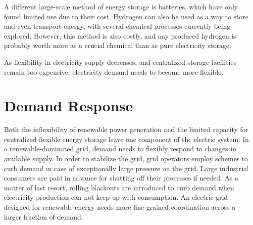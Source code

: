 A different large-scale method of energy storage is batteries, which have only found limited use due to their cost. Hydrogen can also be used as a way to store and even transport energy, with several chemical processes currently being explored.
However, this method is also costly, and any produced hydrogen is probably worth more as a crucial chemical than as pure electricity storage.

As flexibility in electricity supply decreases, and centralized storage facilities remain too expensive, electricity demand needs to become more flexible.


\section{Demand Response}

Both the inflexibility of renewable power generation and the limited capacity for centralized flexible energy storage leave one component of the electric system: In a renewable-dominated grid, demand needs to flexibly respond to changes in available supply.
In order to stabilize the grid, grid operators employ schemes to curb demand in case of exceptionally large pressure on the grid.
Large industrial consumers are paid in advance for shutting off their processes if needed.
As a matter of last resort, rolling blackouts are introduced to curb demand when electricity production can not keep up with consumption.
An electric grid designed for renewable energy needs more fine-grained coordination across a larger fraction of demand.

